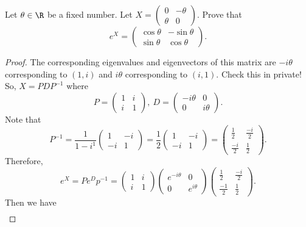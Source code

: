 \begin{eg}
    Let \( \theta \in \R  \) be a fixed number. Let \( X = \begin{pmatrix} 0 & - \theta \\ \theta & 0  \end{pmatrix}  \). Prove that  
    \[  e^{X} = \begin{pmatrix}  \cos \theta & - \sin \theta \\ \sin \theta & \cos \theta \end{pmatrix}. \]
\end{eg}
\begin{proof}
The corresponding eigenvalues and eigenvectors of this matrix are \( - i \theta  \) corresponding to \( (1,i) \) and \( i \theta  \) corresponding to \( (i,1) \). Check this in private! So, \( X = P D P^{-1} \) where 
\[  P = \begin{pmatrix} 1 & i \\ i & 1  \end{pmatrix}  , \ D = \begin{pmatrix} -i \theta & 0 \\ 0 & i \theta \end{pmatrix}. \]
Note that 
\[  P^{-1} = \frac{ 1 }{ 1 - i^{1} }  \begin{pmatrix} 1 & - i \\ - i & 1  \end{pmatrix}  = \frac{ 1 }{ 2 }  \begin{pmatrix} 1 & - i \\ - i & 1  \end{pmatrix} = \begin{pmatrix} \frac{ 1 }{ 2 }  & \frac{ -i }{ 2 } \\ \frac{ -i }{ 2 }  & \frac{ 1 }{ 2 }  \end{pmatrix}.  \]
Therefore,
\[  e^{X} = P e^{D}p^{-1} = \begin{pmatrix}  1 & i \\ i & 1  \end{pmatrix} \begin{pmatrix}  e^{-i \theta} & 0 \\ 0 & e^{i \theta} \end{pmatrix} \begin{pmatrix} \frac{ 1 }{ 2 }  & \frac{ -i }{ 2 }   \\ \frac{ -1 }{ 2 }  & \frac{ 1 }{ 2 } \end{pmatrix}.  \]
Then we have
\begin{align*}

\end{align*}
\end{proof}
